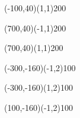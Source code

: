\documentclass[12pt]{article}
\begin{document}
\begin{itemize}
\begin{figure}[htb]
\begin{egame}
\renewcommand{\egarrowstyle}{}

\putbranch(-100,40)(1,1){200}

\renewcommand{\egarrowstyle}{}

\putbranch(700,40)(-1,1){200}

\renewcommand{\egarrowstyle}{}

\putbranch(700,40)(1,1){200}

\renewcommand{\egarrowstyle}{}

\putbranch(-300,-160)(-1,2){100}

\renewcommand{\egarrowstyle}{}

\putbranch(-300,-160)(1,2){100}

\renewcommand{\egarrowstyle}{}

\putbranch(100,-160)(-1,2){100}


\end{egame}
\end{figure}
\end{itemize}
\end{document}
